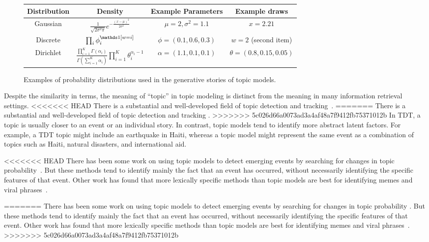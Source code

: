 \begin{figure}
\small
  \begin{tabular}{cccc}
    Distribution & Density & Example Parameters & Example draws \\
    \hline
    Gaussian  & $\frac{1}{\sqrt{2 \sigma^2 \pi}} e^{- \frac{(x-\mu)^2}{2 \sigma^2}}$ & $\mu=2, \sigma^2=1.1$ & $x=2.21$\\
    Discrete  & $\prod_i \phi_i^{\ind{w=i}}$ & $\phi=(0.1, 0.6, 0.3)$
                                                & $w=2$ (second
                                                  item) \\
   Dirichlet & $\frac{\prod_{i=1}^K \Gamma(\alpha_i)}{\Gamma \left( \sum_{i=1}^K \alpha_i \right)} \prod_{i=1}^K \theta_i^{\alpha_i - 1} $ & $\alpha = (1.1, 0.1, 0.1)$  & $\theta = (0.8, 0.15, 0.05)$ \\
     \hline
  \end{tabular}
  \caption{Examples of probability distributions used in the
    generative stories of topic models.}
  \label{fig:distribution_examples}
\end{figure}

Despite the similarity in terms, the meaning of ``topic'' in topic modeling is distinct from the meaning in many information retrieval settings.
<<<<<<< HEAD
There is a substantial and well-developed field of topic detection and tracking~\citep{allan-02}.
=======
There is a substantial and well-developed field of topic detection and tracking \citep{allan-02}.
>>>>>>> 5c026d66a0073ad3a4af48a7f9412fb75371012b
In TDT, a topic is usually closer to an event or an individual story.
In contrast, topic models tend to identify more abstract latent factors.
For example, a TDT topic might include an earthquake in Haiti, whereas a topic model might represent the same event as a combination of topics such as Haiti, natural disasters, and international aid.

<<<<<<< HEAD
There has been some work on using topic models to detect emerging events by searching for changes in topic probability~\citep{alsumait-08}.
But these methods tend to identify mainly the fact that an event has occurred, without necessarily identifying the specific features of that event.
Other work has found that more lexically specific methods than topic models are best for identifying memes and viral phrases~\citep{leskovec-09}.

=======
There has been some work on using topic models to detect emerging events by searching for changes in topic probability \citep{alsumait-08}.
But these methods tend to identify mainly the fact that an event has occurred, without necessarily identifying the specific features of that event.
Other work has found that more lexically specific methods than topic models are best for identifying memes and viral phrases~\citep{leskovec-09}.
\newline
>>>>>>> 5c026d66a0073ad3a4af48a7f9412fb75371012b
